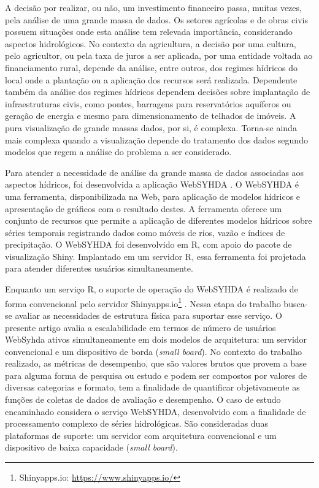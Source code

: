 \documentclass[12pt,english,brazil]{article}
\begin{document}
A decisão por realizar, ou não, um investimento financeiro passa, muitas vezes, pela análise de uma grande
massa de dados. Os setores agrícolas e de obras civis possuem situações onde esta análise tem relevada importância, considerando aspectos hidrológicos. No contexto da agricultura, a decisão
por uma cultura, pelo agricultor, ou pela taxa de juros a ser aplicada, por uma entidade voltada ao
financiamento rural, depende da análise, entre outros, dos regimes hídricos do local onde a plantação ou
a aplicação dos recursos será realizada. Dependente também da análise dos regimes hídricos dependem
decisões sobre implantação de infraestruturas civis, como pontes, barragens para reservatórios aquíferos
ou geração de energia e mesmo para dimensionamento de telhados de imóveis. A pura visualização de
grande massas dados, por si, é complexa. Torna-se ainda mais complexa quando a visualização depende
do tratamento dos dados segundo modelos que regem a análise do problema a ser considerado.

Para atender a necessidade de análise da grande massa de dados associadas aos aspectos hídricos, foi desenvolvida a aplicação WebSYHDA \cite{syhda}. O WebSYHDA é uma ferramenta, disponibilizada na Web, para aplicação de modelos hídricos e apresentação de gráficos com o resultado destes. A
ferramenta oferece um conjunto de recursos que permite a aplicação de diferentes modelos hídricos sobre
séries temporais registrando dados como móveis de rios, vazão e índices de precipitação. O WebSYHDA
foi desenvolvido em R, com apoio do pacote de visualização Shiny. Implantado em um servidor R, essa
ferramenta foi projetada para atender diferentes usuários simultaneamente.

Enquanto um serviço R, o suporte de operação do WebSYHDA é realizado de forma convencional pelo servidor Shinyapps.io\footnote{Shinyapps.io: \url{https://www.shinyapps.io/}} . Nessa etapa do trabalho busca-se avaliar as necessidades de
estrutura física para suportar esse serviço. O presente artigo avalia a escalabilidade em termos de número
de usuários WebSyhda ativos simultaneamente em dois modelos de arquitetura: um servidor convencional
e um dispositivo de borda (\emph{small board}). No contexto do trabalho realizado, as métricas de desempenho, que são valores brutos que provem a base para alguma forma de pesquisa ou estudo e podem ser compostos por valores de diversas categorias e formato, tem a finalidade de quantificar objetivamente as funções de coletas de dados de avaliação e desempenho.
O caso de estudo encaminhado considera o serviço WebSYHDA, desenvolvido com a finalidade de processamento complexo de séries hidrológicas. São consideradas duas plataformas de suporte: um servidor com arquitetura convencional e um dispositivo de baixa capacidade (\emph{small board}). 
\end{document}
